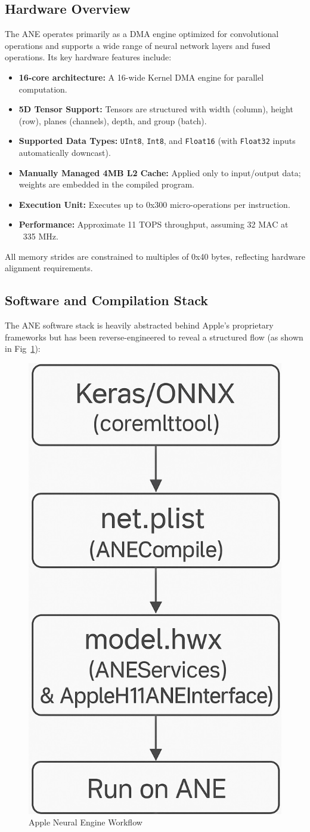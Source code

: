 \subsection{Hardware Overview}

The ANE operates primarily as a DMA engine optimized for convolutional operations and supports a wide range of neural network layers and fused operations. Its key hardware features include:

\begin{itemize}
  \item \textbf{16-core architecture:} A 16-wide Kernel DMA engine for parallel computation.
  \item \textbf{5D Tensor Support:} Tensors are structured with width (column), height (row), planes (channels), depth, and group (batch).
  \item \textbf{Supported Data Types:} \texttt{UInt8}, \texttt{Int8}, and \texttt{Float16} (with \texttt{Float32} inputs automatically downcast).
  \item \textbf{Manually Managed 4MB L2 Cache:} Applied only to input/output data; weights are embedded in the compiled program.
  \item \textbf{Execution Unit:} Executes up to 0x300 micro-operations per instruction.
  \item \textbf{Performance:} Approximate 11 TOPS throughput, assuming 32 MAC at ~335 MHz.
\end{itemize}

All memory strides are constrained to multiples of 0x40 bytes, reflecting hardware alignment requirements.

\subsection{Software and Compilation Stack}

The ANE software stack is heavily abstracted behind Apple's proprietary frameworks but has been reverse-engineered to reveal a structured flow (as shown in Fig~\ref{fig:ane-workflow}):
\begin{figure}[h]
    \centering
    \includegraphics[width=0.25\linewidth]{images/ane-workflow.jpg}
    \caption{Apple Neural Engine Workflow}
    \label{fig:ane-workflow}
\end{figure}

